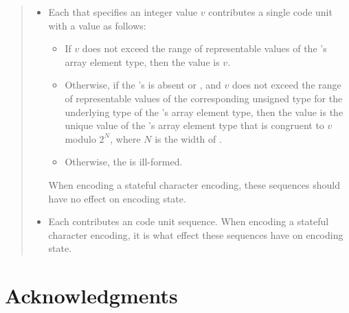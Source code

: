 \documentclass{wg21}
\begin{document}
\begin{quote}
\begin{itemize}
            \item
            Each 
            that specifies an integer value $v$
            contributes a single code unit with a value as follows:
            \begin{itemize}
                \item
                If $v$ does not exceed the range of representable values of
                the 's array element type,
                then the value is $v$.
                \item
                Otherwise,
                if the 's 
                is absent or , and
                $v$ does not exceed the range of representable values of
                the corresponding unsigned type for the underlying type of
                the 's array element type,
                then the value is the unique value of
                the 's array element type 
                that is congruent to $v$ modulo $2^N$, where $N$ is the width of .
                \item
                Otherwise, the  is ill-formed.
            \end{itemize}
            When encoding a stateful character encoding,
            these sequences should have no effect on encoding state.
            \item
            Each 
            contributes an
            code unit sequence.
            When encoding a stateful character encoding,
            it is
            what effect these sequences have on encoding state.
        \end{itemize}




    \end{quote}

    \section{Acknowledgments}
\end{document}

